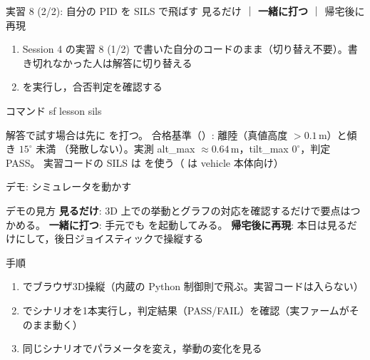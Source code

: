 \begin{frame}[fragile]{実習 8 (2/2): 自分の PID を SILS で飛ばす}
  \vspace{0.15em}
  {\small 見るだけ ｜ \textcolor{sfblue}{\textbf{一緒に打つ}} ｜ 帰宅後に再現}

  \vspace{0.2em}

  \begin{enumerate}\footnotesize\setlength{\itemsep}{0pt}
    \item Session 4 の実習 8 (1/2) で書いた自分のコードのまま（切り替え不要）。書き切れなかった人は解答に切り替える
    \item {} を実行し，合否判定を確認する
  \end{enumerate}

  \begin{sflisting}[basicstyle=\ttfamily\scriptsize]{コマンド}
sf lesson sils
  \end{sflisting}

  \vspace{-2.5mm}

  {\scriptsize 解答で試す場合は先に  を打つ。
  合格基準（）: 離陸（真値高度 $>0.1$\,m）と傾き $15^\circ$ 未満
  （発散しない）。実測 alt\_max $\approx 0.64$\,m，tilt\_max $0^\circ$，判定 PASS。
   実習コードの SILS は  を使う（ は vehicle 本体向け）}
\end{frame}

\begin{frame}{デモ: シミュレータを動かす}
  \begin{exampleblock}{デモの見方}\footnotesize
    \textbf{見るだけ}: 3D 上での挙動とグラフの対応を確認するだけで要点はつかめる。
    \textbf{一緒に打つ}: 手元でも  を起動してみる。
    \textbf{帰宅後に再現}: 本日は見るだけにして，後日ジョイスティックで操縦する
  \end{exampleblock}

  \vspace{0.5em}

  \begin{block}{手順}\footnotesize
    \begin{enumerate}
      \item {} でブラウザ3D操縦（内蔵の Python 制御則で飛ぶ。実習コードは入らない）
      \item {} でシナリオを1本実行し，判定結果（PASS/FAIL）を確認（実ファームがそのまま動く）
      \item 同じシナリオでパラメータを変え，挙動の変化を見る
    \end{enumerate}
  \end{block}
\end{frame}

